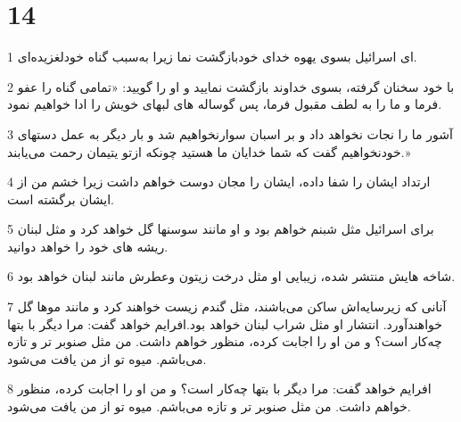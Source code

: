 \chapter{14}

\par 1 ای اسرائیل بسوی یهوه خدای خودبازگشت نما زیرا به‌سبب گناه خودلغزیده‌ای.
\par 2 با خود سخنان گرفته، بسوی خداوند بازگشت نمایید و او را گویید: «تمامی گناه را عفو فرما و ما را به لطف مقبول فرما، پس گوساله های لبهای خویش را ادا خواهیم نمود.
\par 3 آشور ما را نجات نخواهد داد و بر اسبان سوارنخواهیم شد و بار دیگر به عمل دستهای خودنخواهیم گفت که شما خدایان ما هستید چونکه ازتو یتیمان رحمت می‌یابند.»
\par 4 ارتداد ایشان را شفا داده، ایشان را مجان دوست خواهم داشت زیرا خشم من از ایشان برگشته است.
\par 5 برای اسرائیل مثل شبنم خواهم بود و او مانند سوسنها گل خواهد کرد و مثل لبنان ریشه های خود را خواهد دوانید.
\par 6 شاخه هایش منتشر شده، زیبایی او مثل درخت زیتون وعطرش مانند لبنان خواهد بود.
\par 7 آنانی که زیرسایه‌اش ساکن می‌باشند، مثل گندم زیست خواهند کرد و مانند موها گل خواهند‌آورد. انتشار او مثل شراب لبنان خواهد بود.افرایم خواهد گفت: مرا دیگر با بتها چه‌کار است؟ و من او را اجابت کرده، منظور خواهم داشت. من مثل صنوبر تر و تازه می‌باشم. میوه تو از من یافت می‌شود.
\par 8 افرایم خواهد گفت: مرا دیگر با بتها چه‌کار است؟ و من او را اجابت کرده، منظور خواهم داشت. من مثل صنوبر تر و تازه می‌باشم. میوه تو از من یافت می‌شود.



